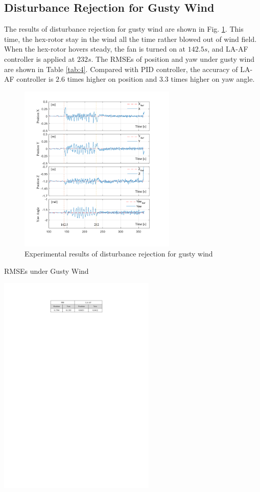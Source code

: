 \documentclass[letterpaper, 10 pt, conference]{ieeeconf}  %
\begin{document}
\subsection{Disturbance Rejection for Gusty Wind}

The results of disturbance rejection for gusty wind are shown in Fig. \ref{f15}.
This time, the hex-rotor stay in the wind all the time rather blowed out of wind field.
When the hex-rotor hovers steady, the fan is turned on at $142.5s$, and LA-AF controller is applied at $232s$.
The RMSEs of position and yaw under gusty wind are shown in Table \ref{tab:4}.
Compared with PID controller, the accuracy of LA-AF controller is $2.6$ times higher on position and $3.3$ times higher on yaw angle.
\begin{figure}[t]
    \centering
    \includegraphics[width=2.95in]{illustrations/fig15.pdf}
    \caption{ Experimental results of disturbance rejection for gusty wind}
    \label{f15}
\end{figure}
\begin{table}[t]
    \caption{RMSEs under Gusty Wind}
    \includegraphics[width=2.95in]{illustrations/tab4.pdf}
    \centering
    \label{tab:4}
\end{table}
\end{document}
